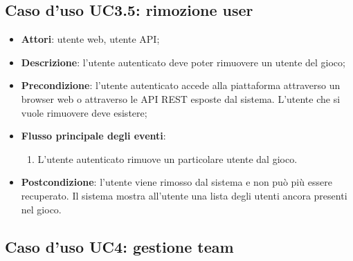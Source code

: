 \subsection{Caso d'uso UC3.5: rimozione user}
\begin{itemize}
\item \textbf{Attori}: utente web, utente API;
\item \textbf{Descrizione}: l'utente autenticato deve poter rimuovere un utente del gioco; 
      \item \textbf{Precondizione}: l'utente autenticato accede alla piattaforma attraverso un browser web o attraverso le API REST esposte dal sistema. L'utente che si vuole rimuovere deve esistere;

        \item \textbf{Flusso principale degli eventi}:
          \begin{enumerate}
          \item L'utente autenticato rimuove un particolare utente dal gioco.

      \end{enumerate}
    \item \textbf{Postcondizione}: l'utente viene rimosso dal sistema e non può più essere recuperato. Il sistema mostra all'utente una lista degli utenti ancora presenti nel gioco.
  \end{itemize}
\hypertarget{UC4}{}
\subsection{Caso d'uso UC4: gestione team}


